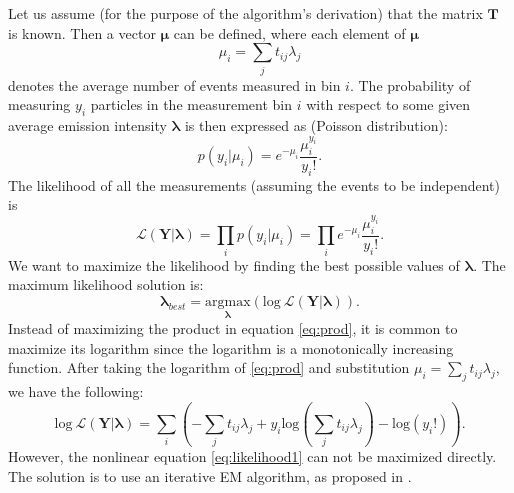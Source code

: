 Let us assume (for the purpose of the algorithm's derivation) that the matrix $\mathbf{T}$ is known.
Then a vector $\bm{\mu}$ can be defined, where each element of $\bm{\mu}$ 
\begin{equation}
  \mu_{i} = \sum_{j} t_{ij}\lambda_{j}
  \label{eq:mu}
\end{equation}
denotes the average number of events measured in bin $i$.
The probability of measuring $y_{i}$ particles in the measurement bin $i$ with respect to some given average emission intensity $\bm{\lambda}$ is then expressed as (Poisson distribution):
\begin{equation}
  p(y_{i} |\mu_{i} ) = e^{-\mu_{i}} \frac{\mu_{i}^{y_i}}{y_{i}!}.
\end{equation}
The likelihood of all the measurements (assuming the events to be independent) is
\begin{equation}  
  \mathcal{L}(\mathbf{Y} | \bm{\lambda}) = \prod_{i}p(y_{i} |\mu_{i} ) = \prod_{i} e^{-\mu_{i}} \frac{\mu_{i}^{y_i}}{y_{i}!}.
  \label{eq:prod}
\end{equation}
We want to maximize the likelihood by finding the best possible values of $\bm{\lambda}$. 
The maximum likelihood solution is:
\begin{equation}
  \bm{\lambda}_{best} = \underset{\bm{\lambda}}{\mathrm{argmax}}( \mathrm{log}\ \mathcal{L}(\mathbf{Y} | \bm{\lambda})).
\end{equation}
Instead of maximizing the product in equation \ref{eq:prod}, it is common to maximize its logarithm since the logarithm is a monotonically increasing function.
After taking the logarithm of \ref{eq:prod} and substitution $\mu_{i} = \sum_{j} t_{ij}\lambda_{j}$, we have the following:
\begin{equation}  
  \mathrm{log}\ \mathcal{L}(\mathbf{Y} | \mathbf{\lambda}) = \sum_{i}\left ( -\sum_{j} t_{ij}\lambda_{j} + y_{i} \mathrm{log}(\sum_{j} t_{ij}\lambda_{j})  - \mathrm{log}(y_{i}!) \right ).
  \label{eq:likelihood1}
\end{equation}
However, the nonlinear equation \ref{eq:likelihood1} can not be maximized directly.
The solution is to use an iterative \ac{EM} algorithm, as proposed in \cite{MLEM_Lange_Carlson_1984}.
